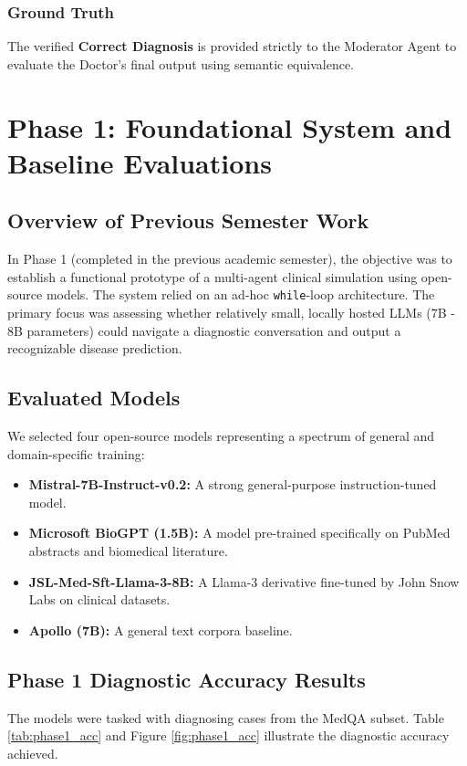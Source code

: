 \documentclass[12pt, a4paper, twoside]{report}
\begin{document}
\subsection{Ground Truth}
The verified \textbf{Correct Diagnosis} is provided strictly to the Moderator Agent to evaluate the Doctor's final output using semantic equivalence.

\chapter{Phase 1: Foundational System and Baseline Evaluations}

\section{Overview of Previous Semester Work}
In Phase 1 (completed in the previous academic semester), the objective was to establish a functional prototype of a multi-agent clinical simulation using open-source models. The system relied on an ad-hoc \texttt{while}-loop architecture. The primary focus was assessing whether relatively small, locally hosted LLMs (7B - 8B parameters) could navigate a diagnostic conversation and output a recognizable disease prediction.

\section{Evaluated Models}
We selected four open-source models representing a spectrum of general and domain-specific training:
\begin{itemize}
    \item \textbf{Mistral-7B-Instruct-v0.2:} A strong general-purpose instruction-tuned model.
    \item \textbf{Microsoft BioGPT (1.5B):} A model pre-trained specifically on PubMed abstracts and biomedical literature.
    \item \textbf{JSL-Med-Sft-Llama-3-8B:} A Llama-3 derivative fine-tuned by John Snow Labs on clinical datasets.
    \item \textbf{Apollo (7B):} A general text corpora baseline.
\end{itemize}

\section{Phase 1 Diagnostic Accuracy Results}
The models were tasked with diagnosing cases from the MedQA subset. Table \ref{tab:phase1_acc} and Figure \ref{fig:phase1_acc} illustrate the diagnostic accuracy achieved.
\end{document}
